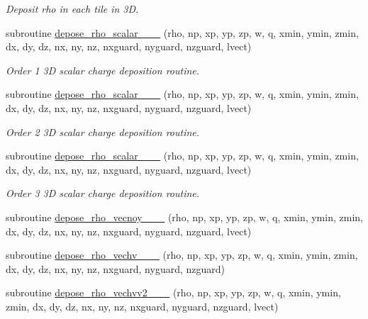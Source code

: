 \begin{DoxyCompactItemize}
\begin{DoxyCompactList}\small\item\em Deposit rho in each tile in 3D. \end{DoxyCompactList}\item 
subroutine \hyperlink{charge__deposition_8_f90_a448f1cab6e843064b45674d43a320022}{depose\+\_\+rho\+\_\+scalar\+\_\+\_\+\_} (rho, np, xp, yp, zp, w, q, xmin, ymin, zmin, dx, dy, dz, nx, ny, nz,                               nxguard, nyguard, nzguard, lvect)
\begin{DoxyCompactList}\small\item\em Order 1 3D scalar charge deposition routine. \end{DoxyCompactList}\item 
subroutine \hyperlink{charge__deposition_8_f90_a38e265fb630353694edfd86592922c74}{depose\+\_\+rho\+\_\+scalar\+\_\+\_\+\_} (rho, np, xp, yp, zp, w, q, xmin, ymin, zmin, dx, dy, dz, nx, ny, nz,                                   nxguard, nyguard, nzguard, lvect)
\begin{DoxyCompactList}\small\item\em Order 2 3D scalar charge deposition routine. \end{DoxyCompactList}\item 
subroutine \hyperlink{charge__deposition_8_f90_a7bc83de646747d60d464cd7bff59db9f}{depose\+\_\+rho\+\_\+scalar\+\_\+\_\+\_} (rho, np, xp, yp, zp, w, q, xmin, ymin, zmin, dx, dy, dz, nx, ny, nz,                                       nxguard, nyguard, nzguard, lvect)
\begin{DoxyCompactList}\small\item\em Order 3 3D scalar charge deposition routine. \end{DoxyCompactList}\item 
subroutine \hyperlink{charge__deposition_8_f90_a570a05e74c2ed2a6fb9f9bf851e68390}{depose\+\_\+rho\+\_\+vecnoy\+\_\+\_\+\_} (rho, np, xp, yp, zp, w, q, xmin, ymin, zmin, dx, dy, dz, nx, ny, nz, nxguard, nyguard, nzguard, lvect)
\item 
subroutine \hyperlink{charge__deposition_8_f90_a9c1d09d89c39bd299a3b894dd419a9c6}{depose\+\_\+rho\+\_\+vechv\+\_\+\_\+\_} (rho, np, xp, yp, zp, w, q, xmin, ymin, zmin, dx, dy, dz, nx, ny, nz, nxguard, nyguard, nzguard)
\item 
subroutine \hyperlink{charge__deposition_8_f90_a8cd073a8fdaca9986ced5d11280777f6}{depose\+\_\+rho\+\_\+vechvv2\+\_\+\_\+\_} (rho, np, xp, yp, zp, w, q, xmin, ymin, zmin, dx, dy, dz, nx, ny, nz, nxguard, nyguard, nzguard, lvect)

\end{DoxyCompactItemize}
